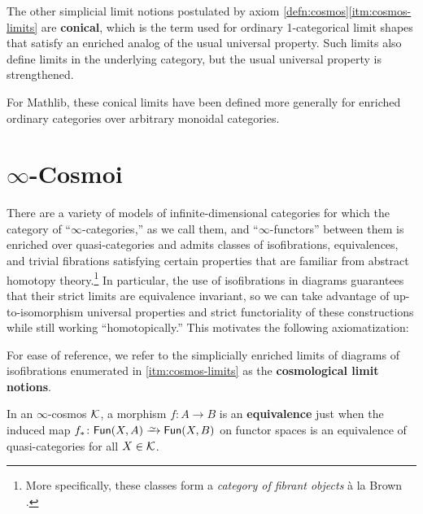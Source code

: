 

The other simplicial limit notions postulated by axiom \ref{defn:cosmos}\ref{itm:cosmos-limits} are \textbf{conical}, which is the term used for ordinary 1-categorical limit shapes that satisfy an enriched analog of the usual universal property.   Such limits also define limits in the underlying category, but the usual universal property is strengthened.


\begin{rmk}
  For Mathlib, these conical limits have been defined more generally for
  enriched ordinary categories over arbitrary monoidal categories.
\end{rmk}

\section{\texorpdfstring{$\infty$}{Infinity}-Cosmoi}\label{sec:cosmos}

There are a variety of models of infinite-dimensional categories for which the category of ``$\infty$-categories,'' as we call them, and ``$\infty$-functors'' between them is enriched over quasi-categories and admits classes of isofibrations, equivalences, and trivial fibrations satisfying certain
properties that are familiar from abstract homotopy theory.\footnote{More specifically, these classes form a \emph{category of fibrant objects} \`{a} la Brown \cite{Brown:1973ah}.} In particular, the use of isofibrations in diagrams guarantees that their strict limits are equivalence invariant, so we can take advantage of up-to-isomorphism universal properties and strict functoriality of these constructions while still working ``homotopically.'' This motivates the following axiomatization:



For ease of reference, we refer to the simplicially enriched limits of diagrams of isofibrations enumerated in \ref{itm:cosmos-limits} as the \textbf{cosmological limit notions}.

\begin{definition}\label{defn:equivalence}
  In an $\infty$-cosmos ${\mathord{\mathcal{K}}}$, a morphism $f\colon A \to B$ is an \textbf{equivalence} just when the induced map $f_* \colon\Fun(X,A) \we \Fun(X,B)$ on functor spaces  is an equivalence of quasi-categories for all $X \in {\mathord{\mathcal{K}}}$.
\end{definition}

